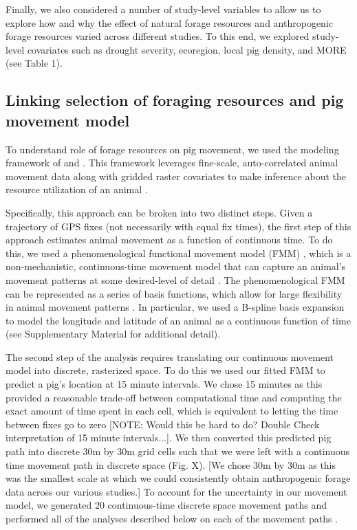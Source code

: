 \documentclass[a4paper]{article}
\begin{document}
Finally, we also considered a number of study-level variables to allow us to explore how and why the effect of natural forage resources and anthropogenic forage resources varied across different studies. To this end, we explored study-level covariates such as drought severity, ecoregion, local pig density, and MORE (see Table 1). 

\subsection*{Linking selection of foraging resources and pig movement model}

To understand role of forage resources on pig movement, we used the modeling framework of \cite{Hanks2015} and \cite{Wilson2018}.  This framework leverages fine-scale, auto-correlated animal movement data along with gridded raster covariates to make inference about the resource utilization of an animal \citep{Hanks2015,Buderman2018,Wilson2018}.  

Specifically, this approach can be broken into two distinct steps. Given a trajectory of GPS fixes (not necessarily with equal fix times), the first step of this approach estimates animal movement as a function of continuous time.  To do this, we used a phenomenological functional movement model (FMM) \citep{Buderman2016,Hooten2017a}, which is a non-mechanistic, continuous-time movement model that can capture an animal's movement patterns at some desired-level of detail \citep{Buderman2016}.  The phenomenological FMM can be represented as a series of basis functions, which allow for large flexibility in animal movement patterns \citep{Buderman2016}.
In particular, we used a B-spline basis expansion to model the longitude and latitude of an animal as a continuous function of time (see Supplementary Material for additional detail).

The second step of the analysis requires translating our continuous movement model into discrete, rasterized space.  To do this we used our fitted FMM to predict a pig's location at 15 minute intervals. We chose 15 minutes as this provided a reasonable trade-off between computational time and computing the exact amount of time spent in each cell, which is equivalent to letting the time between fixes go to zero [NOTE: Would this be hard to do? Double Check interpretation of 15 minute intervals...]. We then converted this predicted pig path into discrete 30m by 30m grid cells such that we were left with a continuous time movement path in discrete space (Fig. X). [We chose 30m by 30m as this was the smallest scale at which we could consistently obtain anthropogenic forage data across our various studies.]
To account for the uncertainty in our movement model, we generated 20 continuous-time discrete space movement paths and performed all of the analyses described below on each of the movement paths \citep{Hanks2015,Buderman2018}.
\end{document}

